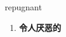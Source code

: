 
\begin{frame}
{\huge repugnant}
\begin{center}
\begin{enumerate}\Large
  \item \textbf{令人厌恶的}
\end{enumerate}
\end{center}
\end{frame}
